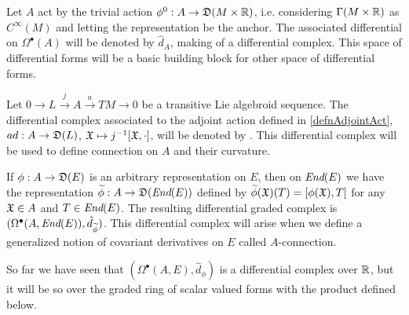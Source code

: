\begin{example}\label{exampleScalarValuedFormsOnAUpToDifferential}
Let $A$ act by the trivial action $\phi^0: A \to \alg D(M \times \bb R)$, i.e. considering $\Gamma(M \times \mathbb{R})$ as $C^\infty(M)$ and letting the representation be the anchor. The associated differential on $\Omega^\bullet(A)$ will be denoted by $\hat d_A$, making of  a differential complex. This space of differential forms will be a basic building block for other space of differential forms.
\end{example}

\begin{example}\label{exampleLValuedFormsonTransitiveAUpToDifferential}
Let $0 \to L \xrightarrow{j} A \xrightarrow{a} TM \to 0$ be a transitive Lie algebroid sequence.
The differential complex associated to the adjoint action defined in \ref{defnAdjointAct}, $ad: A \to \mathfrak{D}(L)$, $\mathfrak{X} \mapsto j^{-1}[\mathfrak{X}, \cdot]$, will be denoted by .
This differential complex will be used to define connection on $A$ and their curvature.
\end{example}


\begin{example}\label{exampleEndEValuedFormsOnTRAnsitiveUpToDifferential}
If $\phi: A \to \alg D(E)$ is an arbitrary representation on $E$, then on $\operatorname{\textit{End}}(E)$ we have the representation $\tilde \phi: A \to \alg D(\End(E))$ defined by $\tilde \phi(\oid X)(T) = [\phi(\oid X), T]$ for any $\mathfrak{X} \in A$ and $T \in \operatorname{\textit{End}}(E)$. 
The resulting differential graded complex is $(\Omega^\bullet(A, \End(E)), \hat d_{\tilde \phi})$. This differential complex will arise when we define a generalized notion of covariant derivatives on $E$ called $A$-connection.
\end{example}

\linea

So far we have seen that $(\Omega^\bullet(A, E), \hat d_\phi)$ is a differential complex over $\mathbb{R}$, but it will be so over the graded ring of scalar valued forms with the product defined below.

